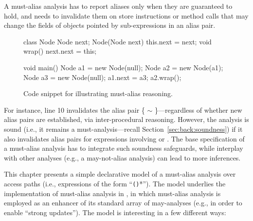A must-alias analysis has to report aliases only when they are guaranteed to hold, and needs to invalidate them on store instructions or method calls that may change the fields of objects pointed by sub-expressions in an alias pair.

\begin{figure}[htb!p]
\begin{javacode}
class Node {
	Node next;
	Node(Node next) { this.next = next; }
	void wrap() { next.next = this; }
}

void main() {
	Node a1 = new Node(null);
	Node a2 = new Node(a1);
	Node a3 = new Node(null);
	a1.next = a3;
	a2.wrap();
}
\end{javacode}
\caption{Code snippet for illustrating must-alias reasoning.}
\label{fig:must-logic:snippet}
\end{figure}

For instance, line 10 invalidates the alias pair \{ $\sim$ \}---regardless of whether new alias pairs are established, via inter-procedural reasoning. However, the analysis is sound (i.e., it remains a must-analysis---recall Section~\ref{sec:back:soundness}) if it also invalidates alias pairs for expressions involving  or . The base specification of a must-alias analysis has to integrate such soundness safeguards, while interplay with other analyses (e.g., a may-not-alias analysis) can lead to more inferences.

This chapter presents a simple declarative model of a must-alias analysis over access paths (i.e., expressions of the form ``\texttt{()}*''). The model underlies the implementation of must-alias analysis in \doop{}, in which must-alias analysis is employed as an enhancer of its standard array of may-analyses (e.g., in order to enable ``strong updates''). The model is interesting in a few different ways:

